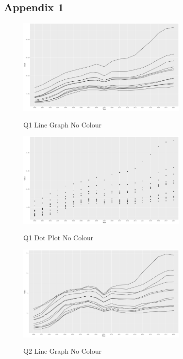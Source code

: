 \documentclass{article}
\begin{document}
\subsection{Appendix 1}
\begin{figure}[H]
  \begin{minipage}[b]{1.0\linewidth}
    \centering
    \centerline{\includegraphics[width=8.5cm]{Q1Geom_line_no_colour}}
    \centerline{Q1 Line Graph No Colour}\medskip
  \end{minipage}
\end{figure}

\begin{figure}[H]
  \begin{minipage}[b]{1.0\linewidth}
    \centering
    \centerline{\includegraphics[width=8.5cm]{Q1Geom_point_no_colour}}
    \centerline{Q1 Dot Plot No Colour}\medskip
  \end{minipage}
\end{figure}

\begin{figure}[H]
  \begin{minipage}[b]{1.0\linewidth}
    \centering
    \centerline{\includegraphics[width=8.5cm]{Q2Geom_line_no_colour}}
    \centerline{Q2 Line Graph No Colour}\medskip
  \end{minipage}
\end{figure}
\end{document}
